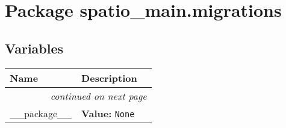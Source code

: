 %
%
%


\section{Package spatio\_main.migrations}

    \label{spatio_main:migrations}


  \subsection{Variables}

    \vspace{-1cm}
\hspace{\varindent}\begin{longtable}{|p{\varnamewidth}|p{\vardescrwidth}|l}
\cline{1-2}
\cline{1-2} \centering \textbf{Name} & \centering \textbf{Description}& \\
\cline{1-2}
\endhead\cline{1-2}\multicolumn{3}{r}{\small\textit{continued on next page}}\\\endfoot\cline{1-2}
\endlastfoot\raggedright \_\-\_\-p\-a\-c\-k\-a\-g\-e\-\_\-\_\- & \raggedright \textbf{Value:} 
{\tt None}&\\
\cline{1-2}
\end{longtable}

